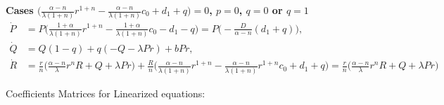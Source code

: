 \documentclass[a4paper,11pt]{article}
\begin{document}
\noindent
{\bf Cases $\Big( \frac{\alpha-n}{\lambda(1+n)} r^{1+n} - \frac{\alpha-n}{\lambda(1+n)}c_0 + d_1 + q \Big)=0$, $p=0$, $q=0$ or $q=1$}
\begin{align*}
 \dot{P}&=P\Big( \frac{1+\alpha}{\lambda(1+n)} r^{1+n} - \frac{1+\alpha}{\lambda(1+n)} c_0 -d_1-q\Big) = P\Big(-\frac{D}{\alpha-n}(d_1+q)\Big),\\
 \dot{Q}&=Q(1-q) +q(-Q-\lambda Pr) + bPr,\\
 \dot{R}&=\frac{r}{n}\Big( \frac{\alpha-n}{\lambda} r^nR + Q + \lambda Pr\Big) + \frac{R}{n}\Big(\frac{\alpha-n}{\lambda(1+n)}r^{1+n}-\frac{\alpha-n}{\lambda(1+n)}r^{1+n}c_0 + d_1 +q\Big) = \frac{r}{n}\Big( \frac{\alpha-n}{\lambda} r^nR + Q + \lambda Pr\Big)
\end{align*}

Coefficients Matrices for Linearized equations:
\end{document}
